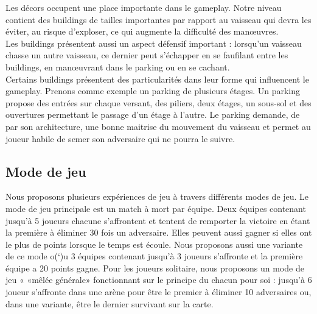 \documentclass[12pt, titlepage]{article}
\begin{document}
\begin{spacing}{1.5}
Les décors occupent une place importante dans le gameplay. Notre niveau contient des buildings de tailles importantes par rapport au vaisseau qui devra les éviter, au risque d'exploser, ce qui augmente la difficulté des manœuvres.\\

Les buildings présentent aussi un aspect défensif important : lorsqu'un vaisseau chasse un autre vaisseau, ce dernier peut s'échapper en se faufilant entre les buildings, en manœuvrant dans le parking ou en se cachant. \\

Certains buildings présentent des particularités dans leur forme qui influencent le gameplay. Prenons comme exemple un parking de plusieurs étages. Un parking propose des entrées sur chaque versant, des piliers, deux étages, un sous-sol et des ouvertures permettant le passage d'un étage à l'autre. Le parking demande, de par son architecture, une bonne maitrise du mouvement du vaisseau et permet au joueur habile de semer son adversaire qui ne pourra le suivre. \\

\subsection{Mode de jeu}

Nous proposons plusieurs expériences de jeu à travers différents modes de jeu. Le mode de jeu principale est un match à mort par équipe. Deux équipes contenant jusqu'à 5 joueurs chacune s'affrontent et tentent de remporter la victoire en étant la première à éliminer 30 fois un adversaire. Elles peuvent aussi gagner si elles ont le plus de points lorsque le temps est écoule. Nous proposons aussi une variante de ce mode o(‘)u 3 équipes contenant jusqu'à 3 joueurs s'affronte et la première équipe a 20 points gagne. Pour les joueurs solitaire, nous proposons un mode de jeu « «mêlée générale» fonctionnant sur le principe du chacun pour soi : jusqu'à 6 joueur s'affronte dans une arène pour être le premier à éliminer 10 adversaires ou, dans une variante, être le dernier survivant sur la carte. \\


\end{spacing}
\end{document}
